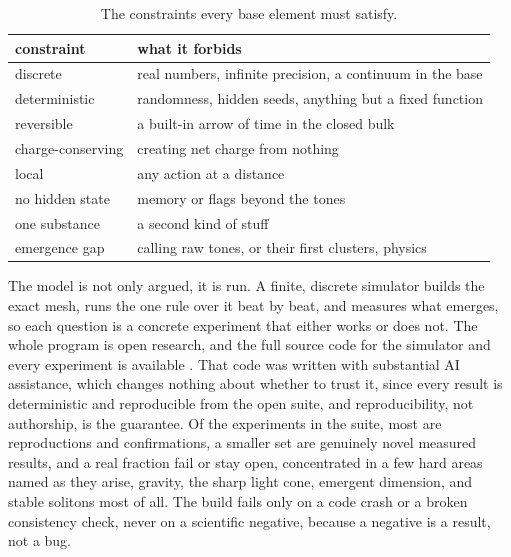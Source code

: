 \begin{table}[ht]
\centering
\begin{tabular}{@{}lp{}@{}}
\toprule
constraint & what it forbids \\
\midrule
discrete & real numbers, infinite precision, a continuum in the base \\
deterministic & randomness, hidden seeds, anything but a fixed function \\
reversible & a built-in arrow of time in the closed bulk \\
charge-conserving & creating net charge from nothing \\
local & any action at a distance \\
no hidden state & memory or flags beyond the tones \\
one substance & a second kind of stuff \\
emergence gap & calling raw tones, or their first clusters, physics \\
\bottomrule
\end{tabular}
\caption{The constraints every base element must satisfy.}
\label{tab:constraints}
\end{table}

The model is not only argued, it is run. A finite, discrete simulator builds the exact mesh, runs the one rule over it beat by beat, and measures what emerges, so each question is a concrete experiment that either works or does not. The whole program is open research, and the full source code for the simulator and every experiment is available \cite{cluesurf2026repo}. That code was written with substantial AI assistance, which changes nothing about whether to trust it, since every result is deterministic and reproducible from the open suite, and reproducibility, not authorship, is the guarantee. Of the experiments in the suite, most are reproductions and confirmations, a smaller set are genuinely novel measured results, and a real fraction fail or stay open, concentrated in a few hard areas named as they arise, gravity, the sharp light cone, emergent dimension, and stable solitons most of all. The build fails only on a code crash or a broken consistency check, never on a scientific negative, because a negative is a result, not a bug.
